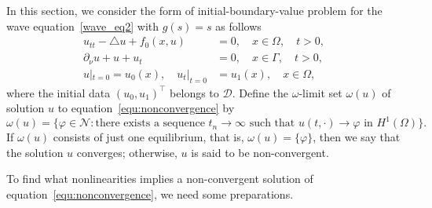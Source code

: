 \documentclass{elsarticle}
\begin{document}
In this section, we consider the form of initial-boundary-value problem for the wave equation~\eqref{wave_eq2} with $g(s)=s$ as follows
\begin{equation} \label{equ:nonconvergence}
\begin{split}
u_{tt} -\triangle u + f_0(x, u)&=0,\quad x\in\Omega,\quad t>0, \\
\partial_{\nu} u + u +u_t &= 0,\quad x\in\Gamma,\quad t>0,\\
u|_{t=0} = u_{0}(x), \quad u_{t}|_{t=0} &= u_{1}(x), \quad x\in \Omega,
\end{split}
\end{equation}
where the initial data $(u_0, u_1)^\top$ belongs to $\mathcal{D}$.
Define the $\omega$-limit set $\omega(u)$ of solution $u$ to equation~\eqref{equ:nonconvergence} by
\[
	\omega(u) = \{\varphi\in \mathcal{N}: \textrm{there exists a sequence $t_n\rightarrow \infty$ such that $u(t, \cdot) \rightarrow\varphi$ in $H^1(\Omega)$} \}.
\]
If $\omega(u)$ consists of just one equilibrium, that is,  $\omega(u) = \{\varphi\}$, then we say that the solution $u$ converges; otherwise, $u$ is said to be non-convergent.

To find what nonlinearities implies a non-convergent solution of equation~\eqref{equ:nonconvergence}, we need some preparations.
\end{document}

